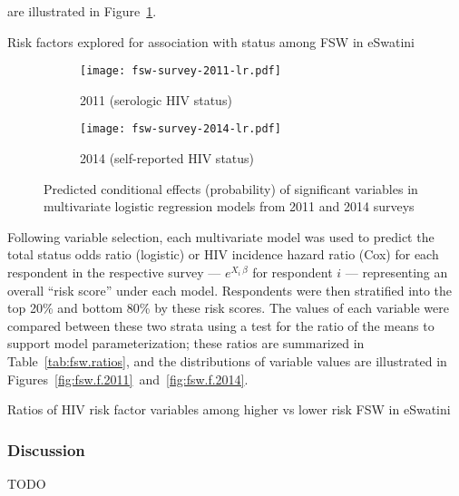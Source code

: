 are illustrated in Figure~\ref{fig:fsw.lr}.
\begin{table}
  \centering
  \caption{Risk factors explored for association with \hivp status among FSW in eSwatini}
  \label{tab:fsw.stats}
  
\end{table}
\begin{figure}
  \begin{subfigure}{0.4\linewidth}
    \centering
    \texttt{[image: fsw-survey-2011-lr.pdf]}
    \caption{2011 (serologic HIV status)}
  \end{subfigure}%
  \begin{subfigure}{0.6\linewidth}
    \centering
    \texttt{[image: fsw-survey-2014-lr.pdf]}
    \caption{2014 (self-reported HIV status)}
  \end{subfigure}
  \caption{Predicted conditional effects (probability)
    of significant variables in multivariate logistic regression models
    from 2011 and 2014 surveys}
  \label{fig:fsw.lr}
\end{figure}
\par
Following variable selection, each multivariate model was used to predict
the total \hivp status odds ratio (logistic) or HIV incidence hazard ratio (Cox)
for each respondent in the respective survey ---
\ie $e^{X_i\,\beta}$ for respondent $i$ ---
representing an overall ``risk score'' under each model.
Respondents were then stratified into the top 20\% and bottom 80\% by these risk scores.
The values of each variable were compared between these two strata
using a test for the ratio of the means \cite{Tamhane2004}
to support model parameterization;
these ratios are summarized in Table~\ref{tab:fsw.ratios},
and the distributions of variable values are illustrated in
Figures~\ref{fig:fsw.f.2011}~and~\ref{fig:fsw.f.2014}.
\begin{table}
  \centering
  \caption{Ratios of HIV risk factor variables among higher vs lower risk FSW in eSwatini}
  \label{tab:fsw.ratios}
  
\end{table}
\subsubsection{Discussion}\label{model.par.fsw.disc}
TODO

